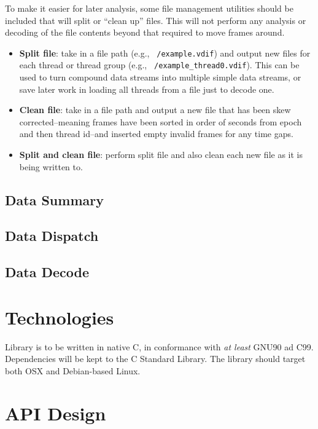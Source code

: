 \documentclass[11pt]{article}
\begin{document}
To make it easier for later analysis, some file management utilities should be included that will split or ``clean up'' files. This will not perform any analysis or decoding of the file contents beyond that required to move frames around.

\begin{itemize}
	\item \textbf{Split file}: take in a file path (e.g., \texttt{~/example.vdif}) and output new files for each thread or thread group (e.g., \texttt{~/example\_thread0.vdif}). This can be used to turn compound data streams into multiple simple data streams, or save later work in loading all threads from a file just to decode one.
	\item \textbf{Clean file}: take in a file path and output a new file that has been skew corrected--meaning frames have been sorted in order of seconds from epoch and then thread id--and inserted empty invalid frames for any time gaps.
	\item \textbf{Split and clean file}: perform split file and also clean each new file as it is being written to.
\end{itemize}

\subsection{Data Summary}

\subsection{Data Dispatch}

\subsection{Data Decode}

\section{Technologies}

Library is to be written in native C, in conformance with \textit{at least} GNU90 ad C99. Dependencies will be kept to the C Standard Library. The library should target both OSX and Debian-based Linux.

\section{API Design}
\end{document}
